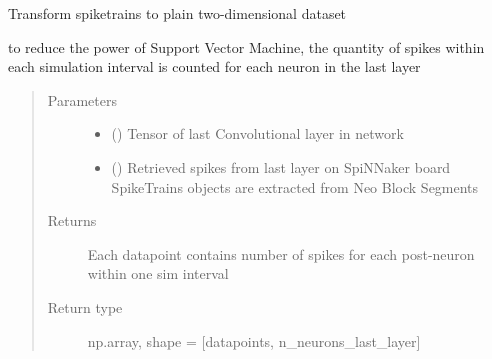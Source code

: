 \documentclass[letterpaper,10pt,english]{sphinxmanual}
\begin{document}
\begin{fulllineitems}
\label{\detokenize{SpikingConvNet:SpikingConvNet.algorithms.spikes_for_classifier}}
Transform spiketrains to plain two-dimensional dataset

to reduce the power of Support Vector Machine, the quantity of spikes
within each simulation interval is counted for each neuron in the last
layer
\begin{quote}\begin{description}
\item[{Parameters}] \leavevmode\begin{itemize}
\item {} 
 () \textendash{} Tensor of last Convolutional layer in network

\item {} 
 () \textendash{} Retrieved spikes from last layer on SpiNNaker board
SpikeTrains objects are extracted from Neo Block Segments

\end{itemize}

\item[{Returns}] \leavevmode
{} \textendash{} Each datapoint contains number of spikes for each post-neuron
within one sim interval

\item[{Return type}] \leavevmode
np.array, shape = {[}datapoints, n\_neurons\_last\_layer{]}

\end{description}\end{quote}

\end{fulllineitems}

\end{document}
